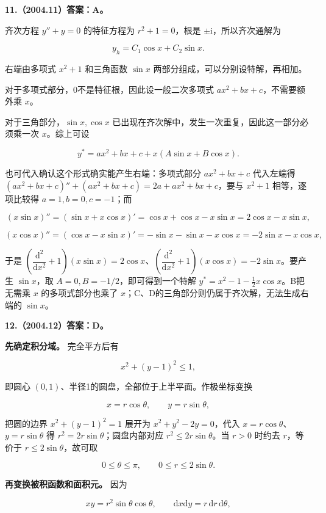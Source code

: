 \documentclass[UTF8,11pt,fontset=windows]{ctexart}
\begin{document}
\clearpage

\textbf{11.（2004.11）答案：A。}

齐次方程 $y''+y=0$ 的特征方程为 $r^2+1=0$，根是 $\pm\mathrm i$，所以齐次通解为

$$
y_h=C_1\cos x+C_2\sin x.
$$

右端由多项式 $x^2+1$ 和三角函数 $\sin x$ 两部分组成，可以分别设特解，再相加。

对于多项式部分，0不是特征根，因此设一般二次多项式 $ax^2+bx+c$，不需要额外乘 $x$。

对于三角部分，$\sin x,\cos x$ 已出现在齐次解中，发生一次重复，因此这一部分必须乘一次 $x$。综上可设

$$
\boxed{y^*=ax^2+bx+c+x(A\sin x+B\cos x).}
$$

也可代入确认这个形式确实能产生右端：多项式部分 $ax^2+bx+c$ 代入左端得 $(ax^2+bx+c)''+(ax^2+bx+c)=2a+ax^2+bx+c$，要与 $x^2+1$ 相等，逐项比较得 $a=1,b=0,c=-1$；而

$$
(x\sin x)''=(\sin x+x\cos x)'=\cos x+\cos x-x\sin x=2\cos x-x\sin x,
$$

$$
(x\cos x)''=(\cos x-x\sin x)'=-\sin x-\sin x-x\cos x=-2\sin x-x\cos x,
$$

于是 $\left(\dfrac{\mathrm d^2}{\mathrm dx^2}+1\right)(x\sin x)=2\cos x$、$\left(\dfrac{\mathrm d^2}{\mathrm dx^2}+1\right)(x\cos x)=-2\sin x$。要产生 $\sin x$，取 $A=0,B=-1/2$，即可得到一个特解 $y^*=x^2-1-\tfrac12x\cos x$。B把无需乘 $x$ 的多项式部分也乘了 $x$；C、D的三角部分则仍属于齐次解，无法生成右端的 $\sin x$。

\clearpage

\textbf{12.（2004.12）答案：D。}

\textbf{先确定积分域。} 完全平方后有

$$
x^2+(y-1)^2\le1,
$$

即圆心 $(0,1)$、半径1的圆盘，全部位于上半平面。作极坐标变换

$$
x=r\cos\theta,\qquad y=r\sin\theta,
$$

把圆的边界 $x^2+(y-1)^2=1$ 展开为 $x^2+y^2-2y=0$，代入 $x=r\cos\theta$、$y=r\sin\theta$ 得 $r^2=2r\sin\theta$；圆盘内部对应 $r^2\le2r\sin\theta$。当 $r>0$ 时约去 $r$，等价于 $r\le2\sin\theta$，故可取

$$
0\le\theta\le\pi,\qquad 0\le r\le2\sin\theta.
$$

\textbf{再变换被积函数和面积元。} 因为

$$
xy=r^2\sin\theta\cos\theta,
\qquad \mathrm dx\mathrm dy=r\,\mathrm dr\,\mathrm d\theta,
$$
\end{document}
